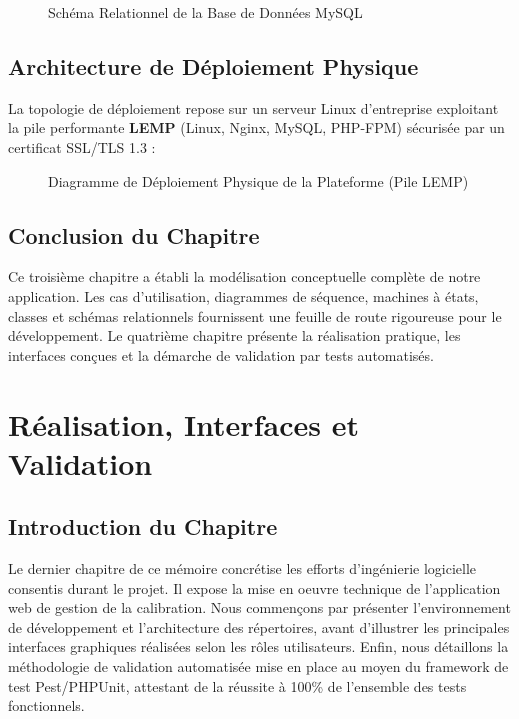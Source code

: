 \documentclass{bts-report}
\begin{document}
\begin{figure}[H]
  \centering
  
  \caption{Sch\'ema Relationnel de la Base de Donn\'ees MySQL}
  \label{fig:db-cluster}
\end{figure}

\section{Architecture de D\'eploiement Physique}
La topologie de d\'eploiement repose sur un serveur Linux d'entreprise exploitant la pile performante \textbf{LEMP} (Linux, Nginx, MySQL, PHP-FPM) s\'ecuris\'ee par un certificat SSL/TLS 1.3 :

\begin{figure}[H]
  \centering
  
  \caption{Diagramme de D\'eploiement Physique de la Plateforme (Pile LEMP)}
  \label{fig:deployment}
\end{figure}

\section*{Conclusion du Chapitre}
Ce troisi\`eme chapitre a \'etabli la mod\'elisation conceptuelle compl\`ete de notre application. Les cas d'utilisation, diagrammes de s\'equence, machines \`a \'etats, classes et sch\'emas relationnels fournissent une feuille de route rigoureuse pour le d\'eveloppement. Le quatri\`eme chapitre pr\'esente la r\'ealisation pratique, les interfaces con\c{c}ues et la d\'emarche de validation par tests automatis\'es.


\chapter{R\'ealisation, Interfaces et Validation}

\section*{Introduction du Chapitre}
Le dernier chapitre de ce m\'emoire concr\'etise les efforts d'ing\'enierie logicielle consentis durant le projet. Il expose la mise en oeuvre technique de l'application web de gestion de la calibration. Nous commen\c{c}ons par pr\'esenter l'environnement de d\'eveloppement et l'architecture des r\'epertoires, avant d'illustrer les principales interfaces graphiques r\'ealis\'ees selon les r\^oles utilisateurs. Enfin, nous d\'etaillons la m\'ethodologie de validation automatis\'ee mise en place au moyen du framework de test Pest/PHPUnit, attestant de la r\'eussite \`a 100\% de l'ensemble des tests fonctionnels.
\end{document}
